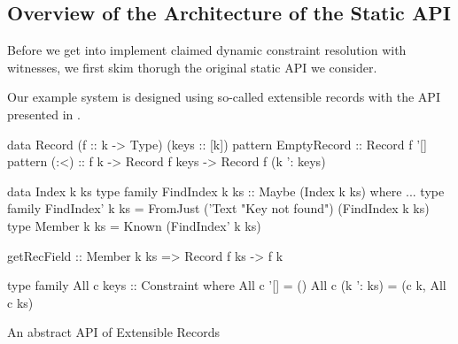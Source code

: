 \documentclass[demotion-paper.tex]{subfiles}
\begin{document}
\subsection{Overview of the Architecture of the Static API}\label{sec:static-api}
Before we get into implement claimed dynamic constraint resolution with witnesses, we first skim thorugh the original static API we consider.

Our example system is designed using so-called extensible records with the API presented in .
\begin{listing}[htbp]
\begin{code}
data Record (f :: k -> Type) (keys :: [k])
pattern EmptyRecord :: Record f '[]
pattern (:<) :: f k -> Record f keys -> Record f (k ': keys)

data Index k ks
type family FindIndex k ks :: Maybe (Index k ks) where ...
type family FindIndex' k ks = 
  FromJust ('Text "Key not found") (FindIndex k ks)
type Member k ks = Known (FindIndex' k ks)

getRecField :: Member k ks => Record f ks -> f k

type family All c keys :: Constraint where
  All c '[] = ()
  All c (k ': ks) = (c k, All c ks)
\end{code}
\caption{An abstract API of Extensible Records}
\label{lst:ext-rec-api}
\end{listing}
\end{document}
